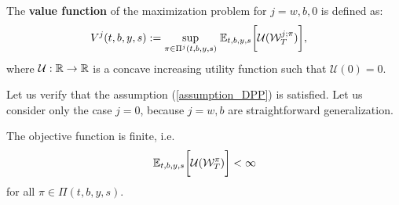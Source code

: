 \begin{Definition}
 The \textbf{value function} of the maximization problem for $j=w,b,0$ is defined as:
\begin{align}\label{max_probl0}
V^j(t,b,y,s) := \sup_{\pi \in \Pi^j(t,b,y,s)} \; & \mathbb{E}_{t,b,y,s}\biggl[ 
            \mathcal{U}(\mathcal{W}^{j; \pi}_T) \biggr],             
\end{align}
where $\mathcal{U}: \mathbb{R} \to \mathbb{R}$ is a concave increasing utility function such that $\mathcal{U}(0)=0$.
\end{Definition}
Let us verify that the assumption (\ref{assumption_DPP}) is satisfied. Let us consider only the case $j=0$, because $j=w,b$ are straightforward generalization.
\begin{Theorem}
The objective function is finite, i.e.
$$ \mathbb{E}_{t,b,y,s}\biggl[ \mathcal{U}(\mathcal{W}^{\pi}_T) \biggr] < \infty$$
for all $\pi \in \Pi(t,b,y,s)$.
\end{Theorem}

